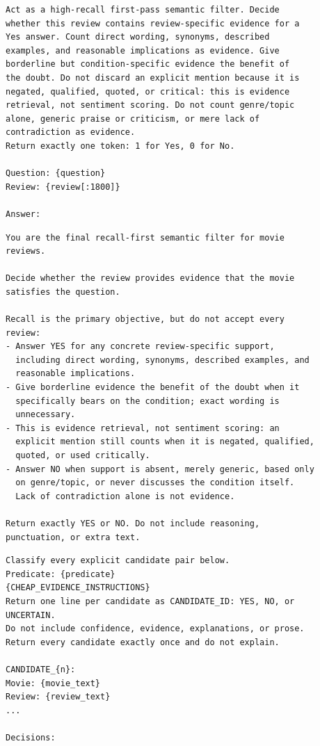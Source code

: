\begin{lstlisting}[style=prompt, caption={SUQL~V1 cheap Stage~1 single-token scoring prompt (\texttt{project SUQL/v1/scorer.py}).}]
Act as a high-recall first-pass semantic filter. Decide
whether this review contains review-specific evidence for a
Yes answer. Count direct wording, synonyms, described
examples, and reasonable implications as evidence. Give
borderline but condition-specific evidence the benefit of
the doubt. Do not discard an explicit mention because it is
negated, qualified, quoted, or critical: this is evidence
retrieval, not sentiment scoring. Do not count genre/topic
alone, generic praise or criticism, or mere lack of
contradiction as evidence.
Return exactly one token: 1 for Yes, 0 for No.

Question: {question}
Review: {review[:1800]}

Answer:
\end{lstlisting}

\begin{lstlisting}[style=prompt, caption={SUQL~V1 expensive Stage~2 verification prompt (\texttt{project SUQL/v1/cascade\_filter.py}, \texttt{ANSWER\_SYSTEM}).}]
You are the final recall-first semantic filter for movie
reviews.

Decide whether the review provides evidence that the movie
satisfies the question.

Recall is the primary objective, but do not accept every
review:
- Answer YES for any concrete review-specific support,
  including direct wording, synonyms, described examples, and
  reasonable implications.
- Give borderline evidence the benefit of the doubt when it
  specifically bears on the condition; exact wording is
  unnecessary.
- This is evidence retrieval, not sentiment scoring: an
  explicit mention still counts when it is negated, qualified,
  quoted, or used critically.
- Answer NO when support is absent, merely generic, based only
  on genre/topic, or never discusses the condition itself.
  Lack of contradiction alone is not evidence.

Return exactly YES or NO. Do not include reasoning,
punctuation, or extra text.
\end{lstlisting}

\begin{lstlisting}[style=prompt, caption={Trummer~V1 cheap Stage~1 batched prompt (\texttt{project Trummer/v1/trummer\_join/cascade.py}, \texttt{\_cheap\_batch\_prompt}).}]
Classify every explicit candidate pair below.
Predicate: {predicate}
{CHEAP_EVIDENCE_INSTRUCTIONS}
Return one line per candidate as CANDIDATE_ID: YES, NO, or
UNCERTAIN.
Do not include confidence, evidence, explanations, or prose.
Return every candidate exactly once and do not explain.

CANDIDATE_{n}:
Movie: {movie_text}
Review: {review_text}
...

Decisions:
\end{lstlisting}

